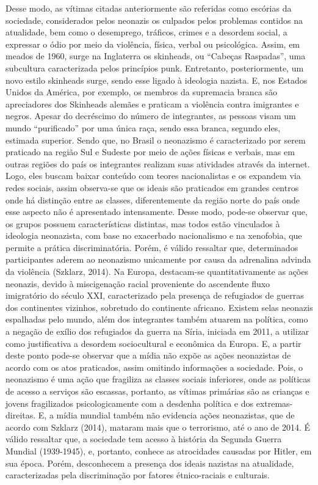 \documentclass[article,12pt,onesidea,4paper,english,brazil]{abntex2}
\begin{document}
	Desse modo, as vítimas citadas anteriormente são referidas como escórias da sociedade, considerados pelos neonazis os culpados pelos problemas contidos na atualidade, bem como o desemprego, tráficos, crimes e a desordem social, a expressar o ódio por meio da violência, física, verbal ou psicológica.
	Assim, em meados de 1960, surge na Inglaterra os skinheads, ou “Cabeças Raspadas”, uma subcultura caracterizada pelos princípios punk. Entretanto, posteriormente, um novo estilo skinheads surge, sendo esse ligado à ideologia nazista.
	E, nos Estados Unidos da América, por exemplo, os membros da supremacia branca são apreciadores dos Skinheads alemães e praticam a violência contra imigrantes e negros. Apesar do decréscimo do número de integrantes, as pessoas visam um mundo “purificado” por uma única raça, sendo essa branca, segundo eles, estimada superior.
	Sendo que, no Brasil o neonazismo é caracterizado por serem praticado na região Sul e Sudeste por meio de ações físicas e verbais, mas em outras regiões do país os integrantes realizam suas atividades através da internet. Logo, eles buscam baixar conteúdo com teores nacionalistas e os expandem via redes sociais, assim observa-se que os ideais são praticados em grandes centros onde há distinção entre as classes, diferentemente da região norte do país onde esse aspecto não é apresentado intensamente.
	Desse modo, pode-se observar que, os grupos possuem características distintas, mas todos estão vinculados à ideologia neonazista, com base no exacerbado nacionalismo e na xenofobia, que permite a prática discriminatória. Porém, é válido ressaltar que, determinados participantes aderem ao neonazismo unicamente por causa da adrenalina advinda da violência (Szklarz, 2014).
	Na Europa, destacam-se quantitativamente as ações neonazis, devido à miscigenação racial proveniente do ascendente fluxo imigratório do século XXI, caracterizado pela presença de refugiados de guerras dos continentes vizinhos, sobretudo do continente africano.
	Existem selas neonazis espalhadas pelo mundo, além dos integrantes também atuarem na política, como a negação de exílio dos refugiados da guerra na Síria, iniciada em 2011, a utilizar como justificativa a desordem sociocultural e econômica da Europa.
	E, a partir deste ponto pode-se observar que a mídia não expõe as ações neonazistas de acordo com os atos praticados, assim omitindo informações a sociedade. Pois, o neonazismo é uma ação que fragiliza as classes sociais inferiores, onde as políticas de acesso a serviços são escassas, portanto, as vítimas primárias são as crianças e jovens fragilizados psicologicamente com a desdenha política e dos extremas-direitas.
	E, a mídia mundial também não evidencia ações neonazistas, que de acordo com Szklarz (2014), mataram mais que o terrorismo, até o ano de 2014.
	É válido ressaltar que, a sociedade tem acesso à história da Segunda Guerra Mundial (1939-1945), e, portanto, conhece as atrocidades causadas por Hitler, em sua época. Porém, desconhecem a presença dos ideais nazistas na atualidade, caracterizadas pela discriminação por fatores étnico-raciais e culturais.
	
\end{document}
